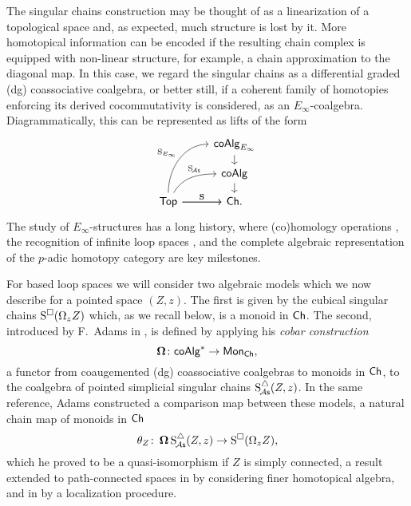 The singular chains construction may be thought of as a linearization of a topological space and, as expected, much structure is lost by it.
More homotopical information can be encoded if the resulting chain complex is equipped with non-linear structure, for example, a chain approximation to the diagonal map.
In this case, we regard the singular chains as a differential graded (dg) coassociative coalgebra, or better still, if a coherent family of homotopies enforcing its derived cocommutativity is considered, as an $E_\infty$-coalgebra.
Diagrammatically, this can be represented as lifts of the form
\begin{equation}
\begin{tikzcd}[column sep=normal, row sep=small]
& \coAlg_{E_\infty} \arrow[d] \\
& \coAlg \arrow[d] \\
\Top \arrow[uur, "\Schains_{E_\infty}", out=90, in=180] \arrow[r, "\Schains"]
\arrow[ur, "\SchainsA", out=60, in=180, near end]
\arrow[r, "\Schains"]
& \Ch.
\end{tikzcd}
\end{equation}
The study of $E_\infty$-structures has a long history, where (co)homology operations \cite{steenrod1962cohomology, may1970general}, the recognition of infinite loop spaces \cite{boardman1973homotopy, may1972geometry}, and the complete algebraic representation of the $p$-adic homotopy category \cite{mandell2001padic} are key milestones.

For based loop spaces we will consider two algebraic models which we now describe for a pointed space $(Z, z)$.
The first is given by the cubical singular chains $\operatorname{S^{\square}}(\Omega_z Z)$ which, as we recall below, is a monoid in $\mathsf{Ch}$.
The second, introduced by F.~Adams in \cite{adams1956cobar}, is defined by applying his \textit{cobar construction}
\[
\operatorname{\mathbf{\Omega}} \colon \mathsf{coAlg}^\ast \to \mathsf{Mon}_{\mathsf{Ch}},
\]
a functor from coaugemented (dg) coassociative coalgebras to monoids in $\mathsf{Ch}$, to the coalgebra of pointed simplicial singular chains $\operatorname{S^{\triangle}_{\!{\mathcal{A}\mathsf{s}}}}(Z,z)$.
In the same reference, Adams constructed a comparison map between these models, a natural chain map of monoids in $\mathsf{Ch}$
\begin{equation} \label{e:adams map}
\theta_Z \colon \operatorname{\mathbf{\Omega}} \operatorname{S^{\triangle}_{\!{\mathcal{A}\mathsf{s}}}}(Z,z) \to \operatorname{S^{\square}}(\Omega_z Z),
\end{equation}
which he proved to be a quasi-isomorphism if $Z$ is simply connected, a result extended to path-connected spaces in \cite{rivera2018cubical} by considering finer homotopical algebra, and in \cite{hess2010cobar} by a localization procedure.

